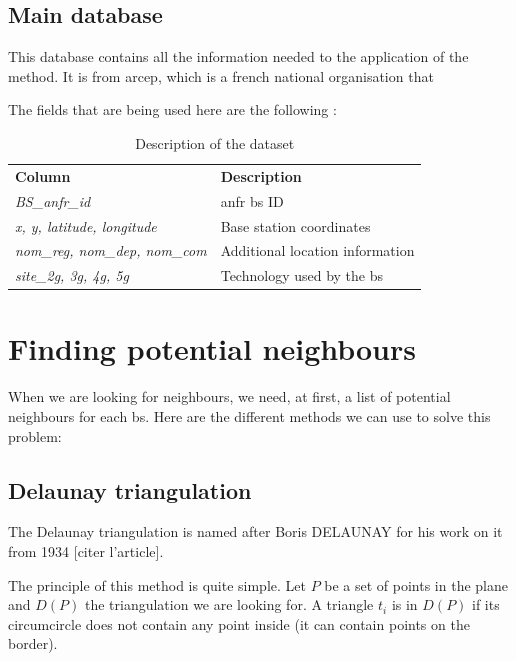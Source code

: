 \documentclass[lettersize,journal,english]{IEEEtran}
\begin{document}
    \subsection{Main database}

    This database \cite{main_database} contains all the information needed to the application of the method. It is from
    \acrfull{arcep}, which is a french national organisation that

    The fields that are being used here are the following :

\begin{table}[!b]
    \centering
    \caption{Description of the dataset}
    \label{data_columns}
    \begin{tabular}{ll}
        \toprule
        \textbf{Column} & \textbf{Description} \\
        \cmidrule(lr){1-2}
        \textsl{BS\_anfr\_id} & \acrshort{anfr} \acrshort{bs} ID \\ 
        \textsl{x, y, latitude, longitude} & Base station coordinates \\ 
        \textsl{nom\_reg, nom\_dep, nom\_com} & Additional location information \\  
        \textsl{site\_2g, 3g, 4g, 5g} & Technology used by the \acrshort{bs} \\ 
        \bottomrule
    \end{tabular}
\end{table}

\section{Finding potential neighbours}
\noindent When we are looking for neighbours, we need, at first, a list of potential neighbours for each \acrfull{bs}.
Here are the different methods we can use to solve this problem:

\subsection{Delaunay triangulation}
\noindent The Delaunay triangulation is named after Boris DELAUNAY for his work on it from 1934 [citer l'article].

The principle of this method is quite simple. Let $P$ be a set of points in the plane and $D(P)$ the triangulation we are looking for.
A triangle $t_i$ is in $D(P)$ if its circumcircle does not contain any point inside (it can contain points on the border).
\end{document}
